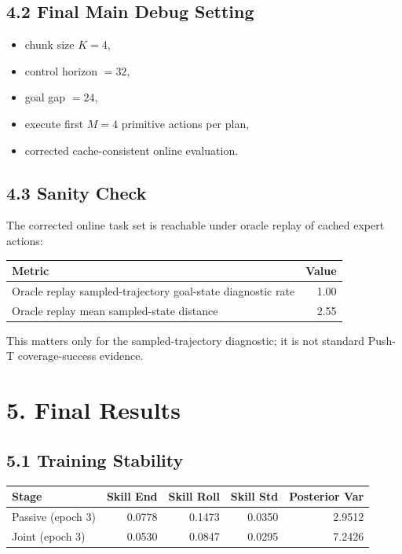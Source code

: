 \documentclass[11pt]{article}
\begin{document}
\subsection*{4.2 Final Main Debug Setting}

\begin{itemize}
\item chunk size \(K = 4\),
\item control horizon \(= 32\),
\item goal gap \(= 24\),
\item execute first \(M = 4\) primitive actions per plan,
\item corrected cache-consistent online evaluation.
\end{itemize}

\subsection*{4.3 Sanity Check}

The corrected online task set is reachable under oracle replay of cached expert actions:

\begin{center}
\begin{tabular}{lr}
\toprule
Metric & Value \\
\midrule
Oracle replay sampled-trajectory goal-state diagnostic rate & 1.00 \\
Oracle replay mean sampled-state distance & 2.55 \\
\bottomrule
\end{tabular}
\end{center}

This matters only for the sampled-trajectory diagnostic; it is not standard Push-T coverage-success evidence.

\section*{5. Final Results}

\subsection*{5.1 Training Stability}

\begin{center}
\begin{tabularx}{0.96\linewidth}{lrrrr}
\toprule
\rowcolor{ReportBlue!10}
Stage & Skill End & Skill Roll & Skill Std & Posterior Var \\
\midrule
Passive (epoch 3) & 0.0778 & 0.1473 & 0.0350 & 2.9512 \\
Joint (epoch 3) & 0.0530 & 0.0847 & 0.0295 & 7.2426 \\
\bottomrule
\end{tabularx}
\end{center}
\end{document}
